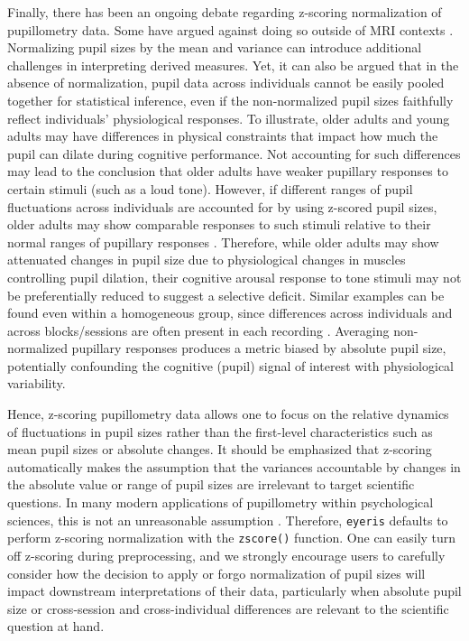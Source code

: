 Finally, there has been an ongoing debate regarding z-scoring normalization of pupillometry data. Some have argued against doing so outside of MRI contexts \parencite{steinhauer2022publication}. Normalizing pupil sizes by the mean and variance can introduce additional challenges in interpreting derived measures. Yet, it can also be argued that in the absence of normalization, pupil data across individuals cannot be easily pooled together for statistical inference, even if the non-normalized pupil sizes faithfully reflect individuals’ physiological responses. To illustrate, older adults and young adults may have differences in physical constraints that impact how much the pupil can dilate during cognitive performance. Not accounting for such differences may lead to the conclusion that older adults have weaker pupillary responses to certain stimuli (such as a loud tone). However, if different ranges of pupil fluctuations across individuals are accounted for by using z-scored pupil sizes, older adults may show comparable responses to such stimuli relative to their normal ranges of pupillary responses \parencite{he2020age}. Therefore, while older adults may show attenuated changes in pupil size due to physiological changes in muscles controlling pupil dilation, their cognitive arousal response to tone stimuli may not be preferentially reduced to suggest a selective deficit. Similar examples can be found even within a homogeneous group, since differences across individuals and across blocks/sessions are often present in each recording \parencite[e.g.,][]{madore2020memory}. Averaging non-normalized pupillary responses produces a metric biased by absolute pupil size, potentially confounding the cognitive (pupil) signal of interest with physiological variability.

Hence, z-scoring pupillometry data allows one to focus on the relative dynamics of fluctuations in pupil sizes rather than the first-level characteristics such as mean pupil sizes or absolute changes. It should be emphasized that z-scoring automatically makes the assumption that the variances accountable by changes in the absolute value or range of pupil sizes are irrelevant to target scientific questions. In many modern applications of pupillometry within psychological sciences, this is not an unreasonable assumption \parencite[i.e.,][]{bradshaw1969background,gilzenrat2010pupil,he2020age,peysakhovich2017impact,vangerven2004memory}. Therefore, \texttt{eyeris} defaults to perform z-scoring normalization with the \texttt{zscore()} function. One can easily turn off z-scoring during preprocessing, and we strongly encourage users to carefully consider how the decision to apply or forgo normalization of pupil sizes will impact downstream interpretations of their data, particularly when absolute pupil size or cross-session and cross-individual differences are relevant to the scientific question at hand.

